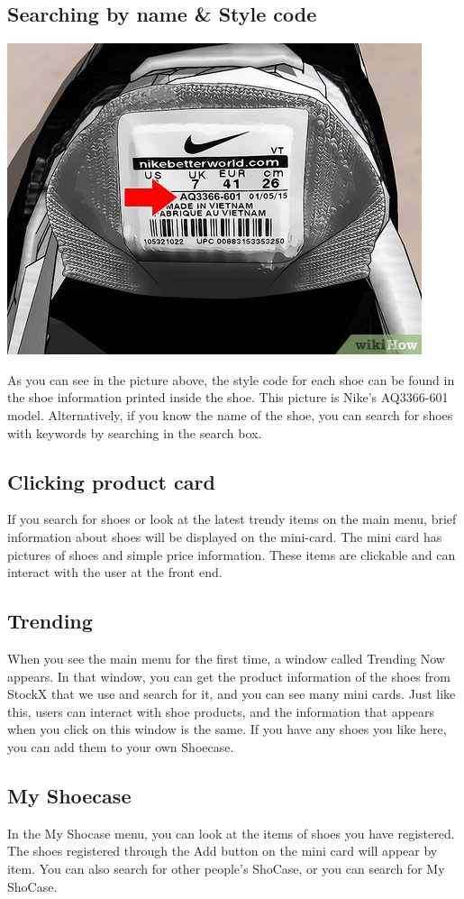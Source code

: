 \documentclass[conference]{IEEEtran}
\begin{document}
\begin{enumerate}
\subsection{Searching by name \& Style code}
\centerline{\includegraphics[scale=2]{pics/Nike_Stylecode.jpg}}
As you can see in the picture above, the style code for each shoe can be found in the shoe information printed inside the shoe. This picture is Nike's AQ3366-601 model. Alternatively, if you know the name of the shoe, you can search for shoes with keywords by searching in the search box.\\
\subsection{Clicking product card}
If you search for shoes or look at the latest trendy items on the main menu, brief information about shoes will be displayed on the mini-card. The mini card has pictures of shoes and simple price information. These items are clickable and can interact with the user at the front end.\\
\subsection{Trending}
When you see the main menu for the first time, a window called Trending Now appears. In that window, you can get the product information of the shoes from StockX that we use and search for it, and you can see many mini cards. Just like this, users can interact with shoe products, and the information that appears when you click on this window is the same. If you have any shoes you like here, you can add them to your own Shoecase.\\
\subsection{My Shoecase}
In the My Shocase menu, you can look at the items of shoes you have registered. The shoes registered through the Add button on the mini card will appear by item. You can also search for other people's ShoCase, or you can search for My ShoCase.
\end{enumerate}
\end{document}

